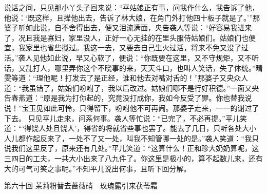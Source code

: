 \documentclass[12pt,oneside]{book}
\begin{document}
说话之间，只见那小丫头子回来说：“平姑娘正有事，问我作什么，我告诉了他，他说：‘既这样，且撵他出去，告诉了林大娘，在角门外打他四十板子就是了。’”那婆子听如此说，自不舍得出去，便又泪流满面，央告袭人等说：“好容易我进来了，况且我是寡妇，家里没人，正好一心无挂的在里头服侍姑娘们。姑娘们也便宜，我家里也省些搅过。我这一去，又要去自己生火过活，将来不免又没了过活。”袭人见他如此说，早又心软了，便说：“你既要在这里，又不守规矩，又不听话，又乱打人，哪里弄你这个不晓事的来，天天斗口，也叫人笑话，失了体统。”晴雯等道：“理他呢！打发去了是正经，谁和他去对嘴对舌的！”那婆子又央众人道：“我虽错了，姑娘们吩咐了，我以后改过。姑娘们哪不是行好积德。”一面又央告春燕道：“原是我为打你起的，究竟没打成你，我如今反受了罪。你也替我说说！”宝玉见如此可怜，只得留下，吩咐他不可再闹。那婆子走来，一一的谢过了下去。
只见平儿走来，问系何事。袭人等忙说：“已完了，不必再提。”平儿笑道：“‘得饶人处且饶人’，得省的将就省些事也罢了。能去了几日，只听各处大小人儿都作起反来了，一处不了又一处，叫我不知管哪一处的是。”袭人笑道：“我只说我们这里反了，原来还有几处。”平儿笑道：“这算什么！正和珍大奶奶算呢，这三四日的工夫，一共大小出来了八九件了。你这里是极小的，算不起数儿来，还有大的可气可笑之事呢。”不知平儿说出何事，且听下回分解。















 
第六十回  茉莉粉替去蔷薇硝　玫瑰露引来茯苓霜
\end{document}
